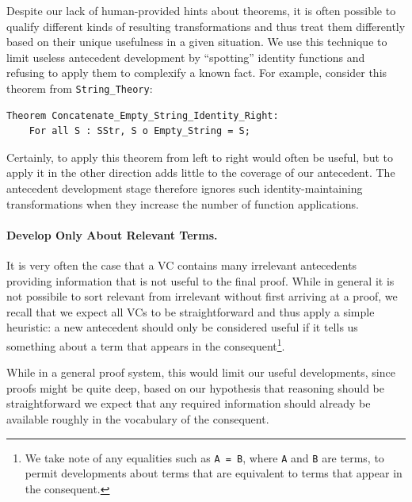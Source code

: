 Despite our lack of human-provided hints about theorems, it is often possible to qualify different kinds of resulting transformations and thus treat them differently based on their unique usefulness in a given situation.  We use this technique to limit useless antecedent development by ``spotting'' identity functions and refusing to apply them to complexify a known fact.  For example, consider this theorem from \texttt{String\_Theory}:

\begin{lstlisting}
Theorem Concatenate_Empty_String_Identity_Right:
	For all S : SStr, S o Empty_String = S;
\end{lstlisting}

Certainly, to apply this theorem from left to right would often be useful, but to apply it in the other direction adds little to the coverage of our antecedent.  The antecedent development stage therefore ignores such identity-maintaining transformations when they increase the number of function applications.

\paragraph{Develop Only About Relevant Terms.}  It is very often the case that a VC contains many irrelevant antecedents providing information that is not useful to the final proof.  While in general it is not possibile to sort relevant from irrelevant without first arriving at a proof, we recall that we expect all VCs to be straightforward and thus apply a simple heuristic: a new antecedent should only be considered useful if it tells us something about a term that appears in the consequent\footnote{We take note of any equalities such as \texttt{A = B}, where \texttt{A} and \texttt{B} are terms, to permit developments about terms that are equivalent to terms that appear in the consequent.}.

While in a general proof system, this would limit our useful developments, since proofs might be quite deep, based on our hypothesis that reasoning should be straightforward we expect that any required information should already be available roughly in the vocabulary of the consequent.


